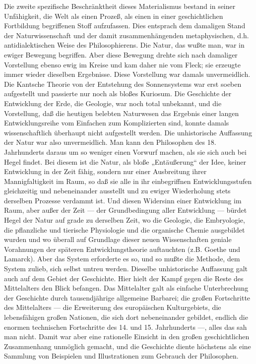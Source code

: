 Die zweite spezifische Beschränktheit dieses Materialismus
bestand in seiner Unfähigkeit, die Welt als einen Prozeß, als einen in
einer geschichtlichen Fortbildung begriffenen Stoff aufzufassen. Dies
entsprach dem damaligen Stand der Naturwissenschaft und der damit
zusammenhängenden metaphysischen, d.h. antidialektischen Weise des
Philosophierens. Die Natur, das wußte man, war in ewiger Bewegung
begriffen. Aber diese Bewegung drehte sich nach damaliger Vorstellung
ebenso ewig im Kreise und kam daher nie vom Fleck; sie erzeugte immer
wieder dieselben Ergebnisse. Diese Vorstellung war damals unvermeidlich.
Die Kantsche Theorie von der Entstehung des Sonnensystems war erst
soeben aufgestellt und passierte nur noch als bloßes Kuriosum. Die
Geschichte der Entwicklung der Erde, die Geologie, war noch total
unbekannt, und die Vorstellung, daß die heutigen belebten Naturwesen das
Ergebnis einer langen Entwicklungsreihe vom Einfachen zum Komplizierten
sind, konnte damals wissenschaftlich überhaupt nicht aufgestellt werden.
Die unhistorische Auffassung der Natur war also unvermeidlich. \textbar{} Man
kann den Philosophen des 18. Jahrhunderts daraus um so weniger einen
Vorwurf machen, als sie sich auch bei Hegel findet. Bei diesem ist die
Natur, als bloße „Entäußerung`` der Idee, keiner Entwicklung in der Zeit
fähig, sondern nur einer Ausbreitung ihrer Mannigfaltigkeit im Raum, so
daß sie alle in ihr einbegriffnen Entwicklungsstufen gleichzeitig und
nebeneinander ausstellt und zu ewiger Wiederholung stets derselben
Prozesse verdammt ist. Und diesen Widersinn einer Entwicklung im Raum,
aber außer der Zeit --- der Grundbedingung aller Entwicklung --- bürdet
Hegel der Natur auf grade zu derselben Zeit, wo die Geologie, die
Embryologie, die pflanzliche und tierische Physiologie und die
organische Chemie ausgebildet wurden und wo überall auf Grundlage dieser
neuen Wissenschaften geniale Vorahnungen der späteren
Entwicklungstheorie auftauchten (z.B. Goethe und Lamarck). Aber das
System erforderte es so, und so mußte die Methode, dem System zulieb,
sich selbst untreu werden. \textbar{} Dieselbe unhistorische Auffassung galt auch
auf dem Gebiet der Geschichte. Hier hielt der Kampf gegen die Reste des
Mittelalters den Blick befangen. Das Mittelalter galt als einfache
Unterbrechung der Geschichte durch tausendjährige allgemeine Barbarei;
die großen Fortschritte des Mittelalters --- die Erweiterung des
europäischen Kulturgebiets, die lebensfähigen großen Nationen, die sich
dort nebeneinander gebildet, endlich die enormen technischen
Fortschritte des 14. und 15. Jahrhunderts ---, alles das sah man nicht.
Damit war aber eine rationelle Einsicht in den großen geschichtlichen
Zusammenhang unmöglich gemacht, und die Geschichte diente höchstens als
eine Sammlung von Beispielen und Illustrationen zum Gebrauch der
Philosophen.

